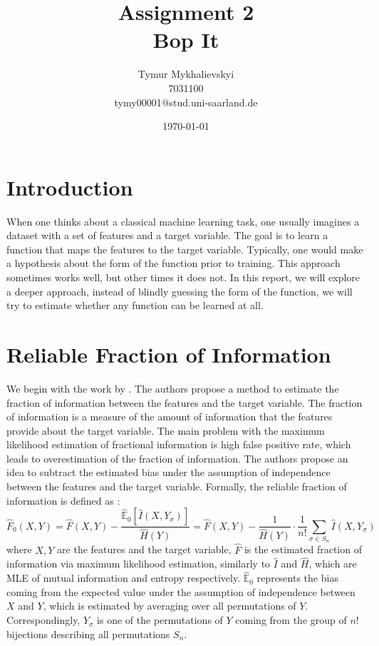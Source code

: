 \documentclass{article}
\title{\vspace{-2cm}Assignment 2\\
    Bop It}
\author{Tymur Mykhalievskyi\\ 7031100\\ tymy00001@stud.uni-saarland.de}
\date{\today}
\begin{document}
\maketitle

\section{Introduction}
When one thinks about a classical machine learning task, one usually imagines a dataset with a set of features and a target variable. The goal is to learn a function that maps the features to the target variable. Typically, one would make a hypothesis about the form of the function prior to training. This approach sometimes works well, but other times it does not. In this report, we will explore a deeper approach, instead of blindly guessing the form of the function, we will try to estimate whether any function can be learned at all. 

\section{Reliable Fraction of Information}
\label{sec:rfi}
We begin with the work by \cite{mandros2017}. The authors propose a method to estimate the fraction of information between the features and the target variable. The fraction of information is a measure of the amount of information that the features provide about the target variable. The main problem with the maximum likelihood estimation of fractional information is high false positive rate, which leads to overestimation of the fraction of information. The authors propose an idea to subtract the estimated bias under the assumption of independence between the features and the target variable. Formally, the reliable fraction of information is defined as \citep{mandros2017}:
\[
\hat{F}_0(X,Y) = \hat{F}(X,Y) - \frac{\hat{\mathbb{E}}_0[\hat{I}(X,Y_\sigma)]}{\hat{H}(Y)} = \hat{F}(X,Y) - \frac{1}{\hat{H}(Y)} \cdot \frac{1}{n!}\sum_{\sigma\in S_n}\hat{I}(X,Y_\sigma)
\]
where $X, Y$ are the features and the target variable, $\hat{F}$ is the estimated fraction of information via maximum likelihood estimation, similarly to $\hat{I}$ and $\hat{H}$, which are MLE of mutual information and entropy respectively. $\hat{\mathbb{E}}_0$ represents the bias coming from the expected value under the assumption of independence between $X$ and $Y$, which is estimated by averaging over all permutations of $Y$. Correspondingly, $Y_\sigma$ is one of the permutations of $Y$ coming from the group of $n!$ bijections describing all permutations $S_n$.
\end{document}
